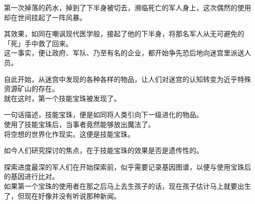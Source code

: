 第一次掉落的药水，掉到了下半身被切去，濒临死亡的军人身上，这次偶然的使用却在世间挂起了一阵风暴。

其效果，如同在嘲讽现代医学般，接起了他的下半身，将那名军人从无可避免的「死」手中救了回来。\\

这一事实，便让政府、军队、乃至有名的企业，都开始争先恐后地向迷宫里派送人员。

自此开始，从迷宫中发现的各种各样的物品，让人们对迷宫的认知转变为近乎特殊资源矿山的存在。\\

就在这时，第一个技能宝珠被发现了。

一句话描述，技能宝珠，便是如同将人类引向下一级进化的物品。\\

使用了技能宝珠后，当事者竟然能够放出魔法了。\\

将空想的世界化作现实。这便是技能宝珠。

如今人们研究探讨的焦点，在于技能宝珠的效果是否是遗传性的。

探索进度最深的军人们在开始探索前，似乎需要记录基因图谱，以便与使用宝珠后的基因进行比对。\\

如果第一个宝珠的使用者在那之后马上去生孩子的话，现在孩子估计马上就要出生了，但现在好像并没有听说那种新闻。

